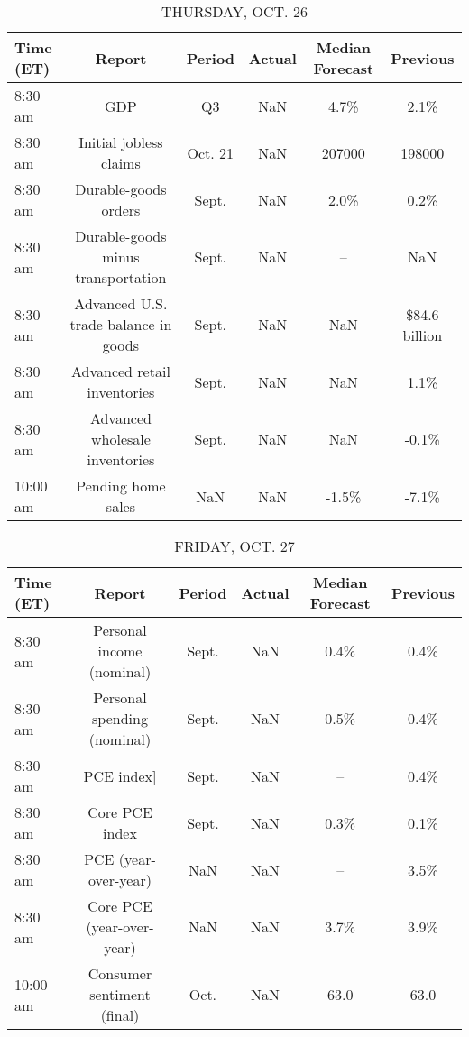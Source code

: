 \documentclass{article}%
\begin{document}
\begin{table}[htbp]%
\caption{THURSDAY, OCT. 26}%
\centering%
\begin{adjustbox}{width=1\textwidth}%
\begin{tabular}{lccccc}
\toprule
Time (ET) &                               Report &  Period & Actual & Median Forecast &      Previous \\
\midrule
  8:30 am &                                  GDP &      Q3 &    NaN &            4.7\% &          2.1\% \\
  8:30 am &               Initial jobless claims & Oct. 21 &    NaN &          207000 &        198000 \\
  8:30 am &                 Durable-goods orders &   Sept. &    NaN &            2.0\% &          0.2\% \\
  8:30 am &   Durable-goods minus transportation &   Sept. &    NaN &              -- &           NaN \\
  8:30 am & Advanced U.S. trade balance in goods &   Sept. &    NaN &             NaN & \$84.6 billion \\
  8:30 am &          Advanced retail inventories &   Sept. &    NaN &             NaN &          1.1\% \\
  8:30 am &       Advanced wholesale inventories &   Sept. &    NaN &             NaN &         -0.1\% \\
 10:00 am &                   Pending home sales &     NaN &    NaN &           -1.5\% &         -7.1\% \\
\bottomrule
\end{tabular}
%
\end{adjustbox}%
\end{table}

%


\begin{table}[htbp]%
\caption{FRIDAY, OCT. 27}%
\centering%
\begin{adjustbox}{width=1\textwidth}%
\begin{tabular}{lccccc}
\toprule
Time (ET) &                      Report & Period & Actual & Median Forecast & Previous \\
\midrule
  8:30 am &   Personal income (nominal) &  Sept. &    NaN &            0.4\% &     0.4\% \\
  8:30 am & Personal spending (nominal) &  Sept. &    NaN &            0.5\% &     0.4\% \\
  8:30 am &                  PCE index] &  Sept. &    NaN &              -- &     0.4\% \\
  8:30 am &              Core PCE index &  Sept. &    NaN &            0.3\% &     0.1\% \\
  8:30 am &        PCE (year-over-year) &    NaN &    NaN &              -- &     3.5\% \\
  8:30 am &   Core PCE (year-over-year) &    NaN &    NaN &            3.7\% &     3.9\% \\
 10:00 am &  Consumer sentiment (final) &   Oct. &    NaN &            63.0 &     63.0 \\
\bottomrule
\end{tabular}
%
\end{adjustbox}%
\end{table}
\end{document}
